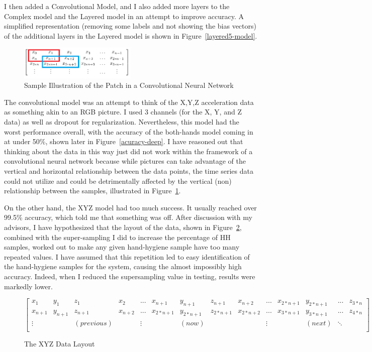 \documentclass[]{report}
\begin{document}
I then added a Convolutional Model, and I also added more layers to the Complex model and the Layered model in an attempt to improve accuracy. A simplified representation (removing some labels and not showing the bias vectors) of the additional layers in the Layered model is shown in Figure~\ref{layered5-model}.

\begin{figure}
	\centering
	\includegraphics[width=0.5\textwidth]{../images/conv-issue}
	\caption{Sample Illustration of the Patch in a Convolutional Neural Network}
	\label{conv-issue}
\end{figure}
The convolutional model was an attempt to think of the X,Y,Z acceleration data as something akin to an RGB picture. I used 3 channels (for the X, Y, and Z data) as well as dropout for regularization. Nevertheless, this model had the worst performance overall, with the accuracy of the both-hands model coming in at under 50\%, shown later in Figure~\ref{acuracy-deep}. I have reasoned out that thinking about the data in this way just did not work within the framework of a convolutional neural network because while pictures can take advantage of the vertical and horizontal relationship between the data points, the time series data could not utilize and could be detrimentally affected by the vertical (non) relationship between the samples, illustrated in Figure~\ref{conv-issue}.

On the other hand, the XYZ model had too much success. It usually reached over 99.5\% accuracy, which told me that something was off. After discussion with my advisors, I have hypothesized that the layout of the data, shown in Figure~\ref{xyz-data}, combined with the super-sampling I did to increase the percentage of HH samples, worked out to make any given hand-hygiene sample have too many repeated values. I have assumed that this repetition led to easy identification of the hand-hygiene samples for the system, causing the almost impossibly high accuracy. Indeed, when I reduced the supersampling value in testing, results were markedly lower.

\begin{figure}
	\centering
	$$
	\left[
	\begin{array}{cccccccccccccc}
	x_{1} & y_{1} & z_{1} & x_{2} & ... & x_{n+1} & y_{n+1} & z_{n+1} & x_{n+2} & ... & x_{2*n+1} & y_{2*n+1} & ... & z_{3*n} \\
	x_{n+1} & y_{n+1} & z_{n+1} & x_{n+2} & ... & x_{2*n+1} & y_{2*n+1} & z_{2*n+1} & x_{2*n+2} & ... & x_{3*n+1} & y_{3*n+1} & ... & z_{4*n} \\
	\vdots & & (previous) & & \vdots & & (now) & &  & \vdots & & (next) & \ddots\\
	\end{array}
	\right]
	$$
	\caption{The XYZ Data Layout}
	\label{xyz-data}
\end{figure}
\end{document}
